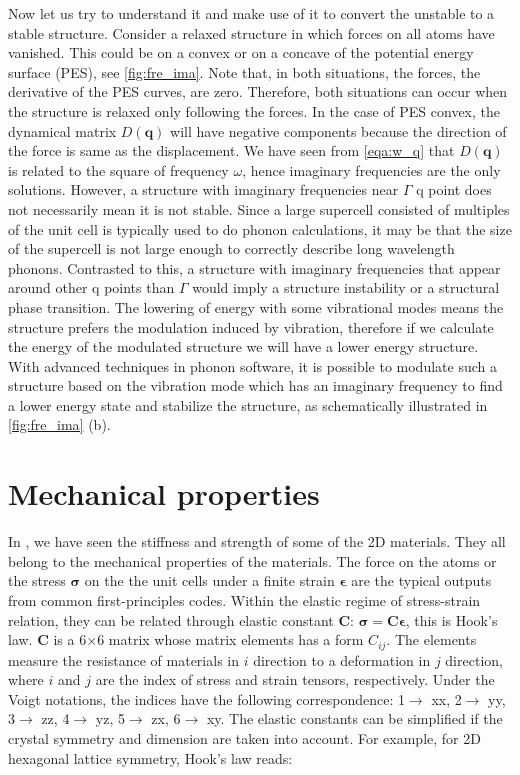 Now let us try to understand it and make use of it to convert the unstable to a stable structure. Consider a relaxed structure in which forces on all atoms have vanished. This could be on a convex or on a concave of the potential energy surface (PES), see \autoref{fig:fre_ima}. Note that, in both situations, the forces, the derivative of the PES curves, are zero. Therefore, both situations can occur when the structure is relaxed only following the forces. In the case of PES convex, the dynamical matrix $D(\mathbf{q})$ will have negative components because the direction of the force is same as the displacement. We have seen from \autoref{eqa:w_q} that $D(\mathbf{q})$ is related to the square of frequency $\omega$, hence imaginary frequencies are the only solutions. However, a structure with imaginary frequencies near $\Gamma$ q point does not necessarily mean it is not stable. Since a large supercell consisted of multiples of the unit cell is typically used to do phonon calculations, it may be that the size of the supercell is not large enough to correctly describe long wavelength phonons. Contrasted to this, a structure with imaginary frequencies that appear around other q points than $\Gamma$ would imply a structure instability or a structural phase transition. The lowering of energy with some vibrational modes means the structure prefers the modulation induced by vibration, therefore if we calculate the energy of the modulated structure we will have a lower energy structure. With advanced techniques in phonon software\cite[e.g.][]{Togo20151}, it is possible to modulate such a structure based on the vibration mode which has an imaginary frequency to find a lower energy state and stabilize the structure, as schematically illustrated in \autoref{fig:fre_ima} (b). 



\section{Mechanical properties}

In , we have seen the stiffness and strength of some of the 2D materials. They all belong to the mechanical properties of the materials. The force on the atoms or the stress $\boldsymbol{\sigma}$ on the the unit cells under a finite strain $\boldsymbol{\epsilon}$ are the typical outputs from common first-principles codes. Within the elastic regime of stress-strain relation, they can be related through elastic constant $\boldsymbol{C}$: $\boldsymbol{\sigma}=\boldsymbol{C}\boldsymbol{\epsilon}$, this is Hook's law. $\boldsymbol{C}$ is a 6$\times$6 matrix whose matrix elements has a form $C_{ij}$. The elements measure the resistance of materials in $i$ direction to a deformation in $j$ direction, where $i$ and $j$ are the index of stress and strain tensors, respectively.  Under the Voigt notations, the indices have the following correspondence: 1$\rightarrow$ xx, 2$\rightarrow$ yy, 3$\rightarrow$ zz, 4$\rightarrow$ yz, 5$\rightarrow$ zx, 6$\rightarrow$ xy. The elastic constants can be simplified if the crystal symmetry and dimension are taken into account. For example, for 2D hexagonal lattice symmetry, Hook's law reads:

